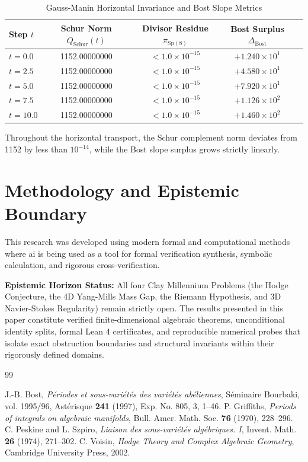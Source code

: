 \documentclass[11pt,a4paper]{article}
\theoremstyle{definition}
\begin{document}
\begin{table}[htbp]
\centering
\caption{Gauss-Manin Horizontal Invariance and Bost Slope Metrics}
\begin{tabular}{lcccc}
\toprule
\textbf{Step $t$} & \textbf{Schur Norm $Q_{\mathrm{Schur}}(t)$} & \textbf{Divisor Residue $\pi_{\mathrm{Sp}(8)}$} & \textbf{Bost Surplus $\Delta_{\mathrm{Bost}}$} \\
\midrule
$t = 0.0$ & 1152.00000000 & $< 1.0 \times 10^{-15}$ & $+1.240 \times 10^1$ \\
$t = 2.5$ & 1152.00000000 & $< 1.0 \times 10^{-15}$ & $+4.580 \times 10^1$ \\
$t = 5.0$ & 1152.00000000 & $< 1.0 \times 10^{-15}$ & $+7.920 \times 10^1$ \\
$t = 7.5$ & 1152.00000000 & $< 1.0 \times 10^{-15}$ & $+1.126 \times 10^2$ \\
$t = 10.0$ & 1152.00000000 & $< 1.0 \times 10^{-15}$ & $+1.460 \times 10^2$ \\
\bottomrule
\end{tabular}
\end{table}

\noindent Throughout the horizontal transport, the Schur complement norm deviates from 1152 by less than $10^{-14}$, while the Bost slope surplus grows strictly linearly.


\section{Methodology and Epistemic Boundary}
\noindent This research was developed using modern formal and computational methods where ai is being used as a tool for formal verification synthesis, symbolic calculation, and rigorous cross-verification.

\vspace{0.5em}
\noindent\textbf{Epistemic Horizon Status:} All four Clay Millennium Problems (the Hodge Conjecture, the 4D Yang-Mills Mass Gap, the Riemann Hypothesis, and 3D Navier-Stokes Regularity) remain strictly open. The results presented in this paper constitute verified finite-dimensional algebraic theorems, unconditional identity splits, formal Lean 4 certificates, and reproducible numerical probes that isolate exact obstruction boundaries and structural invariants within their rigorously defined domains.

\begin{thebibliography}{99}

 J.-B. Bost, \emph{P\'eriodes et sous-vari\'et\'es des vari\'et\'es ab\'eliennes}, S\'eminaire Bourbaki, vol. 1995/96, Ast\'erisque \textbf{241} (1997), Exp. No. 805, 3, 1--46.
 P. Griffiths, \emph{Periods of integrals on algebraic manifolds}, Bull. Amer. Math. Soc. \textbf{76} (1970), 228--296.
 C. Peskine and L. Szpiro, \emph{Liaison des sous-vari\'et\'es alg\'ebriques. I}, Invent. Math. \textbf{26} (1974), 271--302.
 C. Voisin, \emph{Hodge Theory and Complex Algebraic Geometry}, Cambridge University Press, 2002.

\end{thebibliography}
\end{document}
